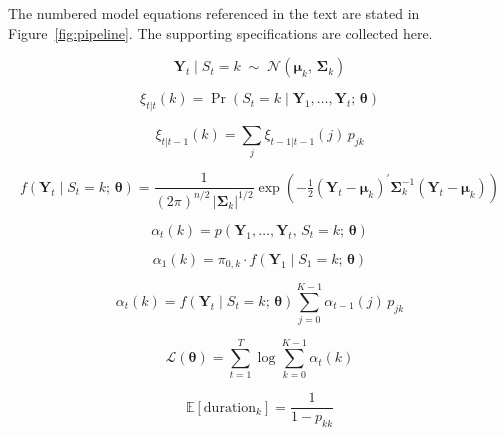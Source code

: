 \documentclass[11pt, a4paper]{article}
\begin{document}
The numbered model equations referenced in the text are stated in
Figure~\ref{fig:pipeline}. The supporting specifications are collected here.

\begin{equation}
  \mathbf{Y}_t \mid S_t = k \;\sim\; \mathcal{N}\!\left(\boldsymbol{\mu}_k,\,
  \boldsymbol{\Sigma}_k\right)
  \label{eq:hmm_emission}
\end{equation}

\begin{equation}
  \xi_{t|t}(k) = \Pr\!\left(S_t = k \mid \mathbf{Y}_1,\ldots,\mathbf{Y}_t;\,
  \boldsymbol{\theta}\right)
  \label{eq:filtered}
\end{equation}

\begin{equation}
  \xi_{t|t-1}(k) = \sum_{j} \xi_{t-1|t-1}(j)\, p_{jk}
  \label{eq:prediction}
\end{equation}

\begin{equation}
  f(\mathbf{Y}_t \mid S_t = k;\,\boldsymbol{\theta})
  = \frac{1}{(2\pi)^{n/2}\,|\boldsymbol{\Sigma}_k|^{1/2}}
    \exp\!\left(-\tfrac{1}{2}
    (\mathbf{Y}_t - \boldsymbol{\mu}_k)^\prime
    \boldsymbol{\Sigma}_k^{-1}
    (\mathbf{Y}_t - \boldsymbol{\mu}_k)
    \right)
  \label{eq:emission_density}
\end{equation}

\begin{equation}
  \alpha_t(k) = p(\mathbf{Y}_1,\ldots,\mathbf{Y}_t,\, S_t = k;\,\boldsymbol{\theta})
  \label{eq:forward_var}
\end{equation}

\begin{equation}
  \alpha_1(k) = \pi_{0,k} \cdot f(\mathbf{Y}_1 \mid S_1 = k;\,\boldsymbol{\theta})
\end{equation}

\begin{equation}
  \alpha_t(k) = f(\mathbf{Y}_t \mid S_t = k;\,\boldsymbol{\theta})
                \sum_{j=0}^{K-1} \alpha_{t-1}(j)\, p_{jk}
  \label{eq:forward_recursion}
\end{equation}

\begin{equation}
  \mathcal{L}(\boldsymbol{\theta})
  = \sum_{t=1}^{T} \log \sum_{k=0}^{K-1} \alpha_t(k)
  \label{eq:loglik}
\end{equation}

\begin{equation}
  \mathbb{E}[\text{duration}_k] = \frac{1}{1 - p_{kk}}
  \label{eq:duration}
\end{equation}
\end{document}
